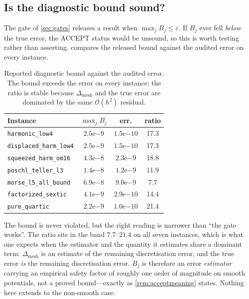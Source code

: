 \documentclass[twocolumn,10pt,a4paper]{article}
\theoremstyle{plain}
\theoremstyle{definition}
\newcommand{\eps}{\varepsilon}
\newcommand{\ACCEPT}{\textsf{ACCEPT}}
\begin{document}
\subsection{Is the diagnostic bound sound?}
\label{sec:boundsound}

The gate of \cref{sec:gates} releases a result when $\max_{j}B_{j} \le \eps$.
If $B_{j}$ ever fell \emph{below} the true error, the \ACCEPT{} status would be
unsound, so this is worth testing rather than asserting.
 compares the released bound against the audited error on every
instance.

\begin{table}[t]
\centering\small
\caption{Reported diagnostic bound against the audited error. The bound exceeds
the error on every instance; the ratio is stable because $\Delta_{\mathrm{mesh}}$
and the true error are dominated by the same $\mathcal{O}(h^{2})$ residual.}
\label{tab:bound}
\begin{tabular}{lccc}
\toprule
Instance & $\max_j B_j$ & err. & ratio \\
\midrule
\texttt{harmonic\_low4}      & $2.5\text{e}{-9}$ & $1.5\text{e}{-10}$ & 17.3\\
\texttt{displaced\_harm\_low4}& $2.5\text{e}{-9}$ & $1.5\text{e}{-10}$ & 17.3\\
\texttt{squeezed\_harm\_om16} & $4.3\text{e}{-8}$ & $2.3\text{e}{-9}$ & 18.8\\
\texttt{poschl\_teller\_l3}  & $1.4\text{e}{-8}$ & $1.2\text{e}{-9}$ & 11.9\\
\texttt{morse\_l5\_all\_bound} & $6.9\text{e}{-8}$ & $9.0\text{e}{-9}$ & 7.7\\
\texttt{factorized\_sextic}  & $4.1\text{e}{-9}$ & $2.9\text{e}{-10}$ & 14.4\\
\texttt{pure\_quartic}       & $2.2\text{e}{-9}$ & $1.0\text{e}{-10}$ & 21.4\\
\bottomrule
\end{tabular}
\end{table}

The bound is never violated, but the right reading is narrower than
``the gate works''. The ratio sits in the band $7.7$--$21.4$ on all seven
instances, which is what one expects when the estimator and the quantity it
estimates share a dominant term: $\Delta_{\mathrm{mesh}}$ is an estimate of the
remaining discretisation error, and the true error \emph{is} the remaining
discretisation error. $B_{j}$ is therefore an error \emph{estimator} carrying an
empirical safety factor of roughly one order of magnitude on smooth potentials,
not a proved bound---exactly as \cref{rem:acceptmeaning} states. Nothing here
extends to the non-smooth case.
\end{document}
